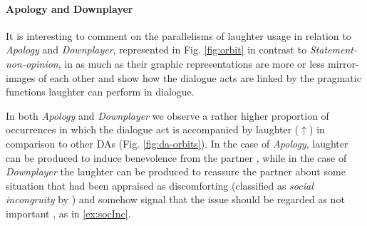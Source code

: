 \documentclass[11pt,a4paper]{article}
\begin{document}





\paragraph{Apology and Downplayer}\label{subs:ap-down}
It is interesting to comment on the parallelisms of laughter usage
in relation to \textit{Apology} and \textit{Downplayer}, represented
in Fig. \ref{fig:orbit} in contrast to \emph{Statement-non-opinion}, in
as much as their graphic representations are more or less mirror-images of each other
 and show how the dialogue acts are 
linked by the pragmatic functions laughter can perform in dialogue.

In both \textit{Apology} and \textit{Downplayer} we observe a rather
higher proportion of occurrences in which the dialogue act is
accompanied by laughter ($\uparrow$) in comparison to other DAs
(Fig. \ref{fig:da-orbits}). In the case of \textit{Apology}, laughter
can be produced to induce benevolence from the partner
\citep{mazzocconiTAC}, while in the case of \textit{Downplayer} the
laughter can be produced to reassure the partner about some situation
that had been appraised as discomforting (classified as \emph{social
incongruity} by \citealp{mazzocconiTAC}) and somehow signal that the
issue should be regarded %
as not important
\citep{romaniuk2009clinton,gazelaughter}, as in \ref{ex:socInc}.

\begin{lingex}
\item\label{ex:socInc}
  \small
\end{lingex}
\end{document}
